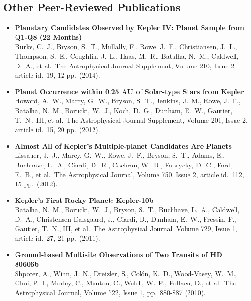 \documentclass[12pt,letterpaper,sans]{moderncv} %
\begin{document}
\subsection{Other Peer-Reviewed Publications}
\begin{itemize}
\item \textbf{ Planetary Candidates Observed by Kepler IV: Planet Sample 
from Q1-Q8 (22 Months) } \\ Burke, C.~J., Bryson, S.~T., Mullally, F., 
Rowe, J.~F., Christiansen, J.~L., Thompson, S.~E., Coughlin, J.~L., Haas, 
M.~R., Batalha, N.~M., Caldwell, D.~A., et al.\ The Astrophysical Journal 
Supplement, Volume 210, Issue 2, article id.~19, 12 pp.~(2014).\ \\ 

 \item \textbf{ Planet Occurrence within 0.25 AU of Solar-type Stars from 
Kepler } \\ Howard, A.~W., Marcy, G.~W., Bryson, S.~T., Jenkins, J.~M., 
Rowe, J.~F., Batalha, N.~M., Borucki, W.~J., Koch, D.~G., Dunham, E.~W., 
Gautier, T.~N., III, et al.\ The Astrophysical Journal Supplement, Volume 
201, Issue 2, article id.~15, 20 pp.~(2012).\ \\ 


 \item \textbf{ Almost All of Kepler's Multiple-planet Candidates Are 
Planets } \\ Lissauer, J.~J., Marcy, G.~W., Rowe, J.~F., Bryson, S.~T., 
Adams, E., Buchhave, L.~A., Ciardi, D.~R., Cochran, W.~D., Fabrycky, D.~C., 
Ford, E.~B., et al.\ The Astrophysical Journal, Volume 750, Issue 2, 
article id.~112, 15 pp.~(2012).\ \\ 

 \item \textbf{ Kepler's First Rocky Planet: Kepler-10b } \\ Batalha, 
N.~M., Borucki, W.~J., Bryson, S.~T., Buchhave, L.~A., Caldwell, D.~A., 
Christensen-Dalsgaard, J., Ciardi, D., Dunham, E.~W., Fressin, F., Gautier, 
T.~N., III, et al.\ The Astrophysical Journal, Volume 729, Issue 1, article 
id.~27, 21 pp.~(2011).\ \\ 

 \item \textbf{ Ground-based Multisite Observations of Two Transits of HD 
80606b } \\ Shporer, A., Winn, J.~N., Dreizler, S., Col{\'o}n, K.~D., 
Wood-Vasey, W.~M., Choi, P.~I., Morley, C., Moutou, C., Welsh, W.~F., 
Pollaco, D., et al.\ The Astrophysical Journal, Volume 722, Issue 1, 
pp.~880-887 (2010).\ \\ 


\end{itemize}
\end{document}
